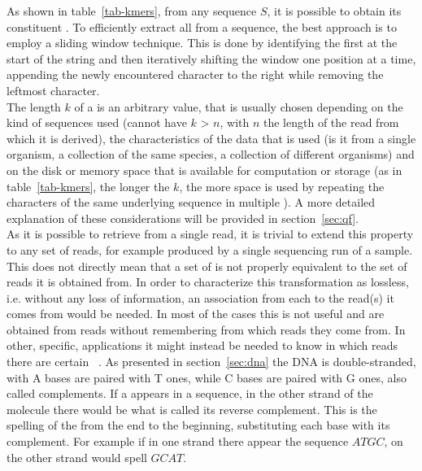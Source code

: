 As shown in table~\ref{tab-kmers}, from any sequence $S$, it is possible to obtain its constituent \kmers. To efficiently extract all \kmers from a sequence, the best approach is to employ a sliding window technique. This is done by identifying the first \kmer at the start of the string and then iteratively shifting the window one position at a time, appending the newly encountered character to the right while removing the leftmost character.\\ The length $k$ of a \kmer is an arbitrary value, that is usually chosen depending on the kind of sequences used (cannot have $k$ > $n$, with $n$ the length of the read from which it is derived), the characteristics of the data that is used (is it from a single organism, a collection of the same species, a collection of different organisms) and on the disk or memory space that is available for computation or storage (as in table~\ref{tab-kmers}, the longer the $k$, the more space is used by repeating the characters of the same underlying sequence in multiple \kmers). A more detailed explanation of these considerations will be provided in section~\ref{sec:qf}.\\
As it is possible to retrieve \kmers from a single read, it is trivial to extend this property to any set of reads, for example produced by a single sequencing run of a sample. This does not directly mean that a set of \kmers is not properly equivalent to the set of reads it is obtained from. In order to characterize this transformation as lossless, i.e. without any loss of information, an association from each \kmer to the read(s) it comes from would be needed. In most of the cases this is not useful and \kmers are obtained from reads without remembering from which reads they come from. In other, specific, applications it might instead be needed to know in which reads there are certain \kmers~\cite{back_to_sequences}. %
As presented in section~\ref{sec:dna} the DNA is double-stranded, with A bases are paired with T ones, while C bases are paired with G ones, also called complements. If a \kmer appears in a sequence, in the other strand of the molecule there would be what is called its reverse complement. This is the spelling of the \kmer from the end to the beginning, substituting each base with its complement. For example if in one strand there appear the sequence $ATGC$, on the other strand would spell $GCAT$.\\
